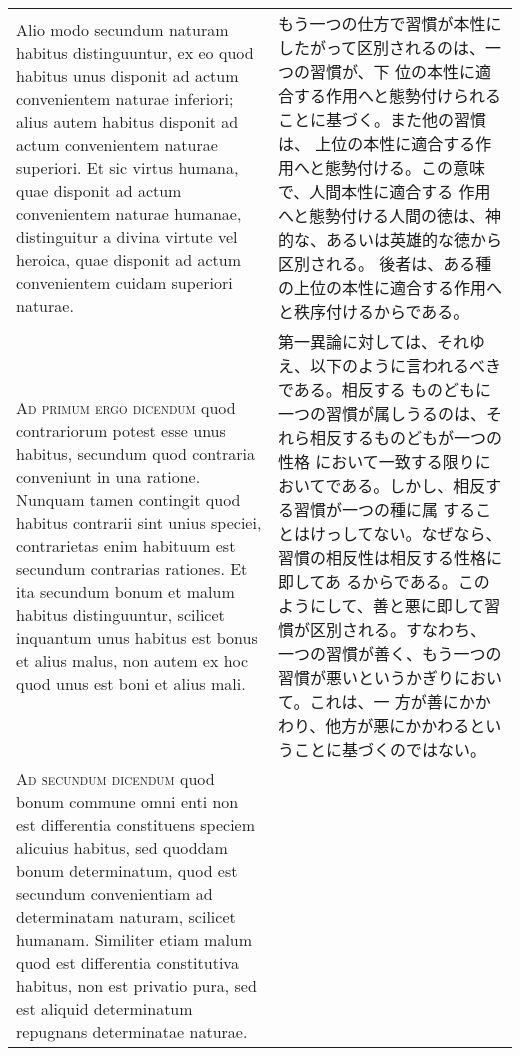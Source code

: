 \documentclass[10pt]{jsarticle} %
\begin{document}
\begin{longtable}{p{21em}p{21em}}
\\


Alio modo secundum naturam habitus distinguuntur, ex eo quod habitus
unus disponit ad actum convenientem naturae inferiori; alius autem
habitus disponit ad actum convenientem naturae superiori. Et sic
virtus humana, quae disponit ad actum convenientem naturae humanae,
distinguitur a divina virtute vel heroica, quae disponit ad actum
convenientem cuidam superiori naturae.

&

もう一つの仕方で習慣が本性にしたがって区別されるのは、一つの習慣が、下
位の本性に適合する作用へと態勢付けられることに基づく。また他の習慣は、
上位の本性に適合する作用へと態勢付ける。この意味で、人間本性に適合する
作用へと態勢付ける人間の徳は、神的な、あるいは英雄的な徳から区別される。
後者は、ある種の上位の本性に適合する作用へと秩序付けるからである。

\\



{\scshape Ad primum ergo dicendum} quod contrariorum potest esse unus
habitus, secundum quod contraria conveniunt in una ratione. Nunquam
tamen contingit quod habitus contrarii sint unius speciei,
contrarietas enim habituum est secundum contrarias rationes. Et ita
secundum bonum et malum habitus distinguuntur, scilicet inquantum unus
habitus est bonus et alius malus, non autem ex hoc quod unus est boni
et alius mali.

&

第一異論に対しては、それゆえ、以下のように言われるべきである。相反する
ものどもに一つの習慣が属しうるのは、それら相反するものどもが一つの性格
において一致する限りにおいてである。しかし、相反する習慣が一つの種に属
することはけっしてない。なぜなら、習慣の相反性は相反する性格に即してあ
るからである。このようにして、善と悪に即して習慣が区別される。すなわち、
一つの習慣が善く、もう一つの習慣が悪いというかぎりにおいて。これは、一
方が善にかかわり、他方が悪にかかわるということに基づくのではない。

\\



{\scshape Ad secundum dicendum} quod bonum commune omni enti non est
differentia constituens speciem alicuius habitus, sed quoddam bonum
determinatum, quod est secundum convenientiam ad determinatam naturam,
scilicet humanam. Similiter etiam malum quod est differentia
constitutiva habitus, non est privatio pura, sed est aliquid
determinatum repugnans determinatae naturae.


\end{longtable}
\end{document}
